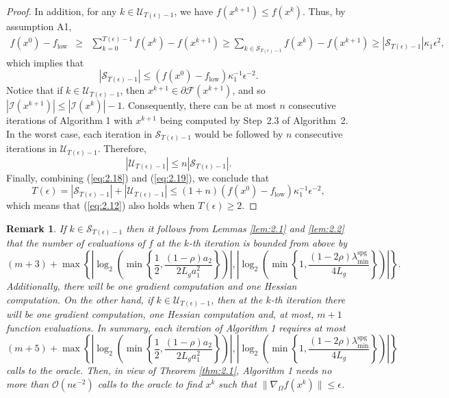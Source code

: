 \documentclass[11pt]{article}
\newtheorem{remark}[theorem]{Remark}
\begin{document}
\begin{proof}
In addition, for any $k\in\mathcal{U}_{T(\epsilon)-1}$, we have $f(x^{k+1})\leq f(x^{k})$. Thus, by assumption A1,
\begin{eqnarray*}
f(x^{0})-f_{\mathrm{low}}
&\geq&\sum_{k=0}^{T(\epsilon)-1} f(x^{k})-f(x^{k+1})\geq \sum_{k\in\mathcal{S}_{T(\epsilon)-1}}f(x^{k})-f(x^{k+1})\geq |\mathcal{S}_{T(\epsilon)-1}|\kappa_{1}\epsilon^{2},
\end{eqnarray*}
which implies that
\begin{equation} \label{eq:2.18}
|\mathcal{S}_{T(\epsilon)-1}|\leq(f(x^{0})-f_{\mathrm{low}}) \kappa_{1}^{-1} \epsilon^{-2}.
\end{equation}
Notice that if $k\in\mathcal{U}_{T(\epsilon)-1}$, then $x^{k+1}\in\partial \mathcal{F}(x^{k+1})$, and so $|\mathcal{I}(x^{k+1})|\leq |\mathcal{I}(x^{k})|-1$. Consequently, there can be at most $n$ consecutive iterations of Algorithm 1 with $x^{k+1}$ being computed by Step~2.3 of Algorithm~2. In the worst case, each iteration in $\mathcal{S}_{T(\epsilon)-1}$ would be followed by $n$ consecutive iterations in $\mathcal{U}_{T(\epsilon)-1}$. Therefore,
\begin{equation} \label{eq:2.19}
|\mathcal{U}_{T(\epsilon)-1}|\leq n|\mathcal{S}_{T(\epsilon)-1}|.
\end{equation}
Finally, combining (\ref{eq:2.18}) and (\ref{eq:2.19}), we conclude that
\[
T(\epsilon) = |\mathcal{S}_{T(\epsilon)-1}| + |\mathcal{U}_{T(\epsilon)-1}| \leq (1+n) (f(x^{0})-f_{\mathrm{low}}) \kappa_{1}^{-1} \epsilon^{-2},
\]
which means that (\ref{eq:2.12}) also holds when $T(\epsilon)\geq 2$.
\end{proof}

\begin{remark}
If $k\in\mathcal{S}_{T(\epsilon)-1}$ then it follows from Lemmas \ref{lem:2.1} and \ref{lem:2.2} that the number of evaluations of $f$ at the $k$-th iteration is bounded from above by 
\[
(m+3)+\max\left\{\left|\log_{2}\left(\min\left\{\frac{1}{2},\frac{(1-\rho)a_{2}}{2L_{g}a_{1}^{2}}\right\}\right)\right|,\left|\log_{2}\left(\min\left\{1,\frac{(1-2\rho)\lambda_{\min}^{\mathrm{spg}}}{4L_{g}}\right\}\right)\right|\right\}.
\]
Additionally, there will be one gradient computation and one Hessian computation. On the other hand, if $k\in\mathcal{U}_{T(\epsilon)-1}$, then at the $k$-th iteration there will be one gradient computation, one Hessian computation and, at most, $m+1$ function evaluations. In summary, each iteration of Algorithm 1 requires at most 
\[
(m+5)+\max\left\{\left|\log_{2}\left(\min\left\{\frac{1}{2},\frac{(1-\rho)a_{2}}{2L_{g}a_{1}^{2}}\right\}\right)\right|,\left|\log_{2}\left(\min\left\{1,\frac{(1-2\rho)\lambda_{\min}^{\mathrm{spg}}}{4L_{g}}\right\}\right)\right|\right\}
\]
calls to the oracle. Then, in view of Theorem \ref{thm:2.1}, Algorithm 1 needs no more than $\mathcal{O}\left(n\epsilon^{-2}\right)$ calls to the oracle to find $x^{k}$ such that $\|\nabla_{\Omega} f(x^{k})\|\leq\epsilon$.
\end{remark}
\end{document}
